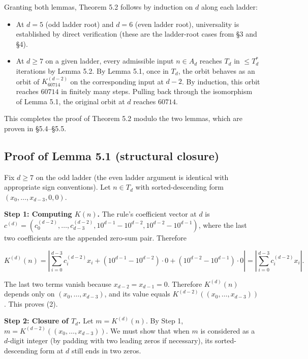\documentclass[11pt,letterpaper]{article}
\providecommand{\tightlist}{%
  \setlength{\itemsep}{0pt}\setlength{\parskip}{0pt}}
\theoremstyle{paperstyle}
\theoremstyle{paperstyledef}
\theoremstyle{paperstylerem}
\begin{document}
Granting both lemmas, Theorem 5.2 follows by induction on \(d\) along
each ladder:

\begin{itemize}
\tightlist
\item
  At \(d = 5\) (odd ladder root) and \(d = 6\) (even ladder root),
  universality is established by direct verification (these are the
  ladder-root cases from §3 and §4).
\item
  At \(d \geq 7\) on a given ladder, every admissible input
  \(n \in A_d\) reaches \(T_d\) in \(\leq T_d^*\) iterations by Lemma
  5.2. By Lemma 5.1, once in \(T_d\), the orbit behaves as an orbit of
  \(K_{60714}^{(d-2)}\) on the corresponding input at \(d - 2\). By
  induction, this orbit reaches \(60714\) in finitely many steps.
  Pulling back through the isomorphism of Lemma 5.1, the original orbit
  at \(d\) reaches \(60714\).
\end{itemize}

This completes the proof of Theorem 5.2 modulo the two lemmas, which are
proven in §5.4--§5.5.

\hypertarget{proof-of-lemma-5.1-structural-closure}{%
\subsection{Proof of Lemma 5.1 (structural closure)}\label{proof-of-lemma-5.1-structural-closure}}

Fix \(d \geq 7\) on the odd ladder (the even ladder argument is
identical with appropriate sign conventions). Let \(n \in T_d\) with
sorted-descending form \((x_0, \ldots, x_{d-3}, 0, 0)\).

\textbf{Step 1: Computing \(K(n)\).} The rule's coefficient vector at
\(d\) is
\(c^{(d)} = (c_0^{(d-2)}, \ldots, c_{d-3}^{(d-2)}, 10^{d-1} - 10^{d-2}, 10^{d-2} - 10^{d-1})\),
where the last two coefficients are the appended zero-sum pair.
Therefore

\[K^{(d)}(n) = \left| \sum_{i = 0}^{d - 3} c_i^{(d-2)} x_i + (10^{d-1} - 10^{d-2}) \cdot 0 + (10^{d-2} - 10^{d-1}) \cdot 0 \right| = \left| \sum_{i = 0}^{d - 3} c_i^{(d-2)} x_i \right|.\]

The last two terms vanish because \(x_{d-2} = x_{d-1} = 0\). Therefore
\(K^{(d)}(n)\) depends only on \((x_0, \ldots, x_{d-3})\), and its value
equals \(K^{(d-2)}((x_0, \ldots, x_{d-3}))\). This proves (2).

\textbf{Step 2: Closure of \(T_d\).} Let \(m = K^{(d)}(n)\). By Step 1,
\(m = K^{(d-2)}((x_0, \ldots, x_{d-3}))\). We must show that when \(m\)
is considered as a \(d\)-digit integer (by padding with two leading
zeros if necessary), its sorted-descending form at \(d\) still ends in
two zeros.
\end{document}
